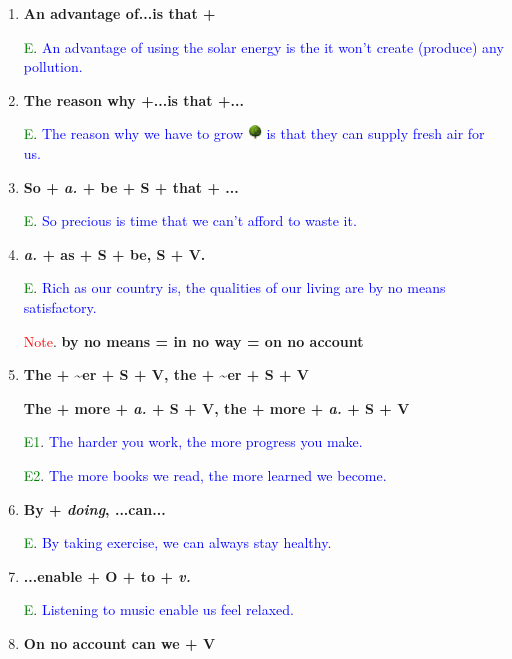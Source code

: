 \documentclass{article}
\begin{document}
\begin{enumerate}
\item \textbf{An advantage of...is that + }

  \textcolor{green}E. \textcolor{blue}{An advantage of using the solar energy is the it
    won't create (produce) any pollution.}

\item \textbf{The reason why +...is that +...}

  \textcolor{green}E. \textcolor{blue}{The reason why we have to grow}
  \includegraphics[height=1em]{tree1} \textcolor{blue}{is that they can supply fresh air
    for us.}

\item \textbf{So + \emph{a.} + be + S + that + ...}
  
  \textcolor{green}E. \textcolor{blue}{So precious is time that we can't afford to waste
it.}

\item \textbf{\emph{a.} + as + S + be, S + V.}

  \textcolor{green}E. \textcolor{blue}{Rich as our country is, the qualities of our living
    are by no means satisfactory.}

  \textcolor{red}{Note}. \textbf{by no means = in no way = on no account}

\item \textbf{The + \textasciitilde{er} + S + V, the + \textasciitilde{er} + S + V}
  
  \textbf{The + more + \emph{a.} + S + V, the + more + \emph{a.} + S + V}

  \textcolor{green}{E1}. \textcolor{blue}{The harder you work, the more progress you
    make.}

  \textcolor{green}{E2}. \textcolor{blue}{The more books we read, the more learned we
    become.}

\item \textbf{By + \emph{doing}, ...can...}

  \textcolor{green}E. \textcolor{blue}{By taking exercise, we can always stay healthy.}

\item \textbf{...enable + O + to + \emph{v.}}

  \textcolor{green}E. \textcolor{blue}{Listening to music enable us feel relaxed.}

\item \textbf{On no account can we + V}


\end{enumerate}
\end{document}

